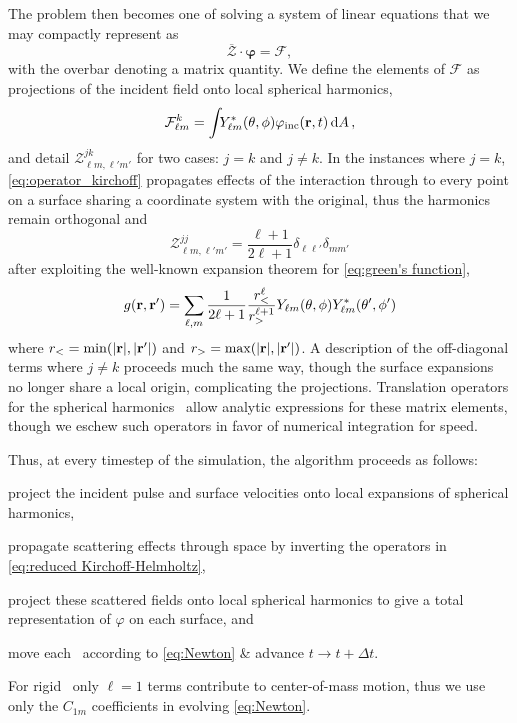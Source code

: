 The problem then becomes one of solving a system of linear equations that we may compactly represent as
\begin{equation}
  \overline{\boldsymbol{\mathcal{Z}}} \cdot \boldsymbol{\varphi} = \boldsymbol{\mathcal{F}},
  \label{eq:z_matrix_system}
\end{equation}
with the overbar denoting a matrix quantity.
We define the elements of $\boldsymbol{\mathcal{F}}$ as projections of the incident field onto local spherical harmonics,
\begin{equation}
  \mathcal{F}_{\ell m}^k = \int_{} Y^*_{\ell m}(\theta, \phi) \varphi_\text{inc}(\vb{r}, t) \dd{A},
  \label{eq:forcing projection}
\end{equation}
and detail $\mathcal{Z}^{jk}_{\ell m, \ell' m'}$ for two cases: $j = k$ and $j \not = k$.
In the instances where $j = k$, \cref{eq:operator_kirchoff} propagates effects of the interaction through to every point on a surface sharing a coordinate system with the original, thus the harmonics remain orthogonal and
\begin{equation}
  \mathcal{Z}_{\ell m, \ell' m'}^{jj} = \frac{\ell + 1}{2\ell + 1}  \delta_{\ell \ell'} \delta_{m m'}
  \label{eq:z_matrix_self}
\end{equation}
after exploiting the well-known expansion theorem for \cref{eq:green's function},
\begin{equation}
  g(\vb{r}, \vb{r}') = \sum_{\ell, m}\frac{1}{2\ell + 1}\frac{r_<^\ell}{r_>^{\ell + 1}}Y_{\ell m}\qty(\theta, \phi)Y^*_{\ell m}\qty(\theta', \phi')
  \label{eq:expansion theorem}
\end{equation}
where $r_< = \mathrm{min}\qty(\abs{\vb{r}},\abs{\vb{r}'})$ and $r_> = \mathrm{max}\qty(\abs{\vb{r}}, \abs{\vb{r}'})$.
A description of the off-diagonal terms where $j \not = k$ proceeds much the same way, though the surface expansions no longer share a local origin, complicating the projections.
Translation operators for the spherical harmonics~\cite{Caola1978,Greengard1987} allow analytic expressions for these matrix elements, though we eschew such operators in favor of numerical integration for speed.

Thus, at every timestep of the simulation, the algorithm proceeds as follows:
\begin{inparaenum}[(i)]
  \item project the incident pulse and surface velocities onto local expansions of spherical harmonics,
  \item propagate scattering effects through space by inverting the operators in \cref{eq:reduced Kirchoff-Helmholtz},
  \item project these scattered fields onto local spherical harmonics to give a total representation of $\varphi$ on each surface, and
  \item move each \bubble\ according to \cref{eq:Newton} \& advance $t \rightarrow t + \Delta t$.
\end{inparaenum}
For rigid \bubbles\ only $\ell = 1$ terms contribute to center-of-mass motion, thus we use only the $C_{1m}$ coefficients in evolving \cref{eq:Newton}.

